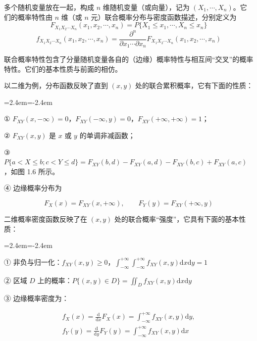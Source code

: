 \documentclass[11pt,openany,UTF8]{ctexbook}
\newcommand{\dif}{\mathrm{d}}                      %
\newenvironment{citemize}
  {\begin{list}{}{\leftmargin=2.4em\itemindent=-2.4em\itemsep=1pt\topsep=3pt\parsep=0pt}}
  {\end{list}}
\begin{document}
多个随机变量放在一起\nobreak，构成 $n$ 维随机变量（或向量\nobreak）\nobreak，记为 $(X_1,\cdots,X_n)$\nobreak。它们的概率特性由 $n$ 维（或 $n$ 元\nobreak）联合概率分布与密度函数描述\nobreak，分别定义为
\begin{equation}
F_{X_1X_2\cdots X_n}(x_1,x_2,\cdots,x_n)=P\{X_1\leqslant x_1,\cdots,X_n\leqslant x_n\}
\label{eq:1.12}
\end{equation}
\begin{equation}
f_{X_1X_2\cdots X_n}(x_1,x_2,\cdots,x_n)=\frac{\partial^n}{\partial x_1\cdots\partial x_n}F_{X_1X_2\cdots X_n}(x_1,x_2,\cdots,x_n)
\label{eq:1.13}
\end{equation}

联合概率特性包含了分量随机变量各自的（边缘\nobreak）概率特性与相互间“交叉”的概率特性\nobreak。它们的基本性质与前面的相仿\nobreak。

以二维为例\nobreak，分布函数反映了直到 $(x,y)$ 处的联合累积概率\nobreak，它有下面的性质\nobreak：

\begin{citemize}
  \item ① $F_{XY}(x,-\infty)=0$\nobreak，$F_{XY}(-\infty,y)=0$\nobreak，$F_{XY}(+\infty,+\infty)=1$\nobreak；
  \item ② $F_{XY}(x,y)$ 是 $x$ 或 $y$ 的单调非减函数\nobreak；
  \item ③ $P\{a<X\leqslant b;c<Y\leqslant d\}=F_{XY}(b,d)-F_{XY}(a,d)-F_{XY}(b,c)+F_{XY}(a,c)$\nobreak，如图 1.6 所示\nobreak。
  \item ④ 边缘概率分布为
\end{citemize}
\[
F_X(x)=F_{XY}(x,+\infty),\qquad F_Y(y)=F_{XY}(+\infty,y)
\]

二维概率密度函数反映了在 $(x,y)$ 处的联合概率“强度”\nobreak，它具有下面的基本性质\nobreak：

\begin{citemize}
  \item ① 非负与归一化\nobreak：$f_{XY}(x,y)\geqslant 0$\nobreak，$\displaystyle\int_{-\infty}^{+\infty}\int_{-\infty}^{+\infty}f_{XY}(x,y)\dif x\dif y=1$
  \item ② 区域 $D$ 上的概率\nobreak：$\displaystyle P\{(x,y)\in D\}=\iint_D f_{XY}(x,y)\dif x\dif y$
  \item ③ 边缘概率密度为\nobreak：
\end{citemize}
\[
\begin{gathered}
f_X(x)=\frac{\dif}{\dif x}F_X(x)=\int_{-\infty}^{+\infty}f_{XY}(x,y)\dif y,\\[4pt]
f_Y(y)=\frac{\dif}{\dif y}F_Y(y)=\int_{-\infty}^{+\infty}f_{XY}(x,y)\dif x
\end{gathered}
\]
\end{document}
